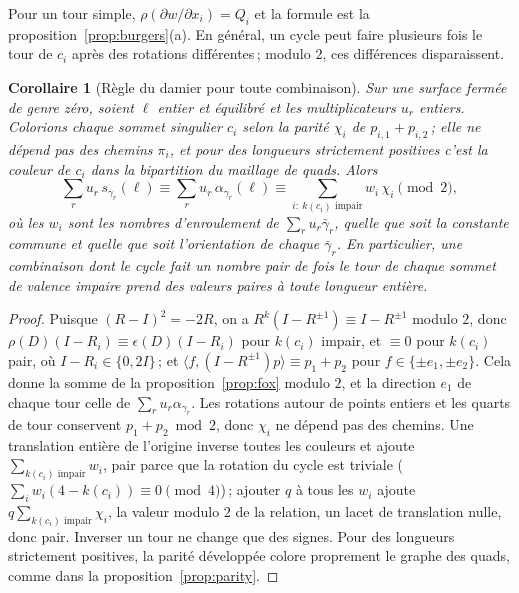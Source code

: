 \documentclass[11pt,a4paper]{article}
\newtheorem{corollary}{Corollaire}
\newcommand{\shift}{s}
\newcommand{\lean}[1]{\texttt{\detokenize{#1}}}
\newenvironment{evidence}[3][]{}{}
\begin{document}
Pour un tour simple, $\rho(\partial w/\partial x_i) = Q_i$ et la formule est
la proposition~\ref{prop:burgers}(a). En général, un cycle peut faire
plusieurs fois le tour de $c_i$ après des rotations différentes\,; modulo
$2$, ces différences disparaissent.

\begin{evidence}{core}{\lean{checkerboard_word}, \lean{checkerboard_combination}\,; supposé~: comme dans la formule ci-dessus}
\begin{corollary}[Règle du damier pour toute combinaison]\label{cor:checker}
Sur une surface fermée de genre zéro, soient $\ell$ entier et équilibré et les
multiplicateurs $u_r$ entiers. Colorions chaque sommet singulier $c_i$ selon
la parité $\chi_i$ de $p_{i,1} + p_{i,2}$\,; elle ne dépend pas des chemins
$\pi_i$, et pour des longueurs strictement positives c'est la couleur de $c_i$
dans la bipartition du maillage de quads. Alors
\[
  \sum_r u_r\, \shift_{\gamma_r}(\ell) \equiv \sum_r u_r\, \alpha_{\gamma_r}(\ell)
  \equiv \sum_{i:\ k(c_i) \text{ impair}} w_i\, \chi_i \pmod 2 ,
\]
où les $w_i$ sont les nombres d'enroulement de $\sum_r u_r \bar\gamma_r$,
quelle que soit la constante commune et quelle que soit l'orientation de
chaque $\bar\gamma_r$. En particulier, une combinaison dont le cycle fait un
nombre pair de fois le tour de chaque sommet de valence impaire prend des
valeurs paires à toute longueur entière.
\end{corollary}
\end{evidence}

\begin{proof}
Puisque $(R - I)^2 = -2R$, on a $R^k(I - R^{\pm1}) \equiv I - R^{\pm1}$
modulo $2$, donc $\rho(D)(I - R_i) \equiv \epsilon(D)(I - R_i)$ pour $k(c_i)$
impair, et $\equiv 0$ pour $k(c_i)$ pair, où $I - R_i \in \{0, 2I\}$\,; et
$\langle f, (I - R^{\pm1})p\rangle \equiv p_1 + p_2$ pour $f \in \{\pm e_1,
\pm e_2\}$. Cela donne la somme de la proposition~\ref{prop:fox} modulo $2$,
et la direction $e_1$ de chaque tour celle de $\sum_r u_r
\alpha_{\gamma_r}$. Les rotations autour de points entiers et les quarts de
tour conservent $p_1 + p_2 \bmod 2$, donc $\chi_i$ ne dépend pas des chemins.
Une translation entière de l'origine inverse toutes les couleurs et ajoute
$\sum_{k(c_i)\text{ impair}} w_i$, pair parce que la rotation du cycle est
triviale ($\sum_i w_i (4 - k(c_i)) \equiv 0 \pmod 4$)\,; ajouter $q$ à tous les
$w_i$ ajoute $q \sum_{k(c_i)\text{ impair}} \chi_i$, la valeur modulo $2$ de
la relation, un lacet de translation nulle, donc pair. Inverser un tour ne
change que des signes. Pour des longueurs strictement positives, la parité
développée colore proprement le graphe des quads, comme dans la
proposition~\ref{prop:parity}.
\end{proof}
\end{document}
